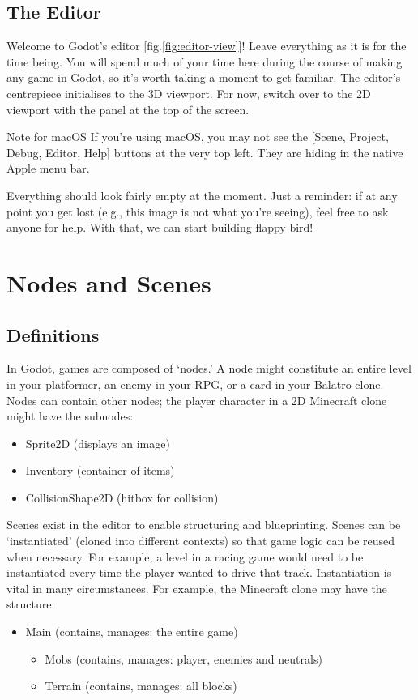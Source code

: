 \documentclass[14pt]{extarticle}
\newcommand{\prettyref}[2]{[{#1}.\ref{#2}]}
\begin{document}
\subsection*{The Editor}
Welcome to Godot's editor \prettyref{fig}{fig:editor-view}! Leave everything as it is for the time being. You will spend much of your time here during the course of making any game in Godot, so it's worth taking a moment to get familiar. The editor's centrepiece initialises to the 3D viewport. For now, switch over to the 2D viewport with the panel at the top of the screen.

\begin{callout-note}{Note for macOS}
If you're using macOS, you may not see the [Scene, Project, Debug, Editor, Help] buttons at the very top left. They are hiding in the native Apple menu bar.
\end{callout-note}

Everything should look fairly empty at the moment. Just a reminder: if at any point you get lost (e.g., this image is not what you’re seeing), feel free to ask anyone for help. With that, we can start building flappy bird!


\clearpage
\section{Nodes and Scenes}
\subsection*{Definitions}
In Godot, games are composed of `nodes.' A node might constitute an entire level in your platformer, an enemy in your RPG, or a card in your Balatro clone. Nodes can contain other nodes; the player character in a 2D Minecraft clone might have the subnodes:
\begin{itemize}
  \item[--] Sprite2D (displays an image)
  \item[--] Inventory (container of items)
  \item[--] CollisionShape2D (hitbox for collision)
\end{itemize}

Scenes exist in the editor to enable structuring and blueprinting. Scenes can be `instantiated' (cloned into different contexts) so that game logic can be reused when necessary. For example, a level in a racing game would need to be instantiated every time the player wanted to drive that track. Instantiation is vital in many circumstances. For example, the Minecraft clone may have the structure:
\begin{itemize}
  \item[--] Main (contains, manages: the entire game)
  \begin{itemize}
    \item[--] Mobs (contains, manages: player, enemies and neutrals)
    \item[--] Terrain (contains, manages: all blocks)
  \end{itemize}
\end{itemize}
\end{document}
